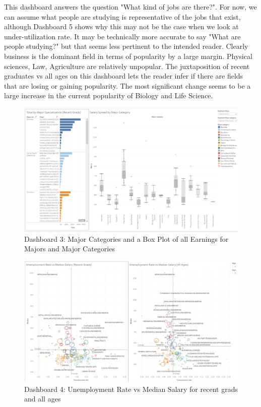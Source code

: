 \documentclass[sigchi]{acmart}
\begin{document}
This dashboard answers the question "What kind of jobs are there?". For now, we can assume what people are studying is representative of the jobs that exist, although Dashboard 5 shows why this may not be the case when we look at under-utilization rate. It may be technically more accurate to say "What are people studying?" but that seems less pertinent to the intended reader. Clearly business is the dominant field in terms of popularity by a large margin. Physical sciences, Law, Agriculture are relatively unpopular. The juxtaposition of recent graduates vs all ages on this dashboard lets the reader infer if there are fields that are losing or gaining popularity. The most significant change seems to be a large increase in the current popularity of Biology and Life Science.


  \begin{figure}[thpb]
  \includegraphics[width=1.0\textwidth]{DB3.png}
     \caption{Dashboard 3: Major Categories and a Box Plot of all Earnings for Majors and Major Categories}
         \label{fig:db3}
  \end{figure}
  
  \begin{figure}[thpb]
  \includegraphics[width=1.0\textwidth]{DB4.png}
     \caption{Dashboard 4: Unemployment Rate vs Median Salary for recent grads and all ages}
         \label{fig:db4}
  \end{figure}
\end{document}
